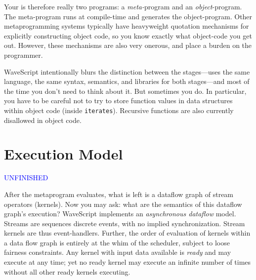 \documentclass[twocolumn]{report}
\newcommand{\rednote}[1]{{\textcolor{blue}{#1}}}
\newcommand{\cde}{\tt}
\begin{document}
Your is therefore really two programs: a {\em meta-}program and an {\em
  object}-program.  The meta-program runs at compile-time and
  generates the object-program.  Other metaprogramming systems
  typically have heavyweight quotation mechanisms for explicitly
  constructing object code, so you know exactly what object-code you
  get out.  However, these mechanisms are also very onerous, and place
  a burden on the programmer.  

WaveScript intentionally blurs the distinction between the
stages---uses the same language, the same syntax, semantics, and
libraries for both stages---and most of the time you don't need to
think about it.  But sometimes you do.  In particular, you have to be
careful not to try to store function values in data structures within
object code (inside {\cde iterates}).  Recursive functions are also
currently disallowed in object code.




\section{Execution Model}

\rednote{UNFINISHED}

After the metaprogram evaluates, what is left is a dataflow graph of
stream operators (kernels).  Now you may ask: what are the semantics
of this dataflow graph's execution?  WaveScript implements an {\em
asynchronous dataflow} model.  Streams are sequences discrete events,
with no implied synchronization.  Stream kernels are thus
event-handlers.  Further, the order of evaluation of kernels within a
data flow graph is entirely at the whim of the scheduler, subject to
loose fairness constraints.  Any kernel with input data available is
{\em ready} and may execute at any time; yet no ready kernel may
execute an infinite number of times without all other ready kernels
executing.
\end{document}
